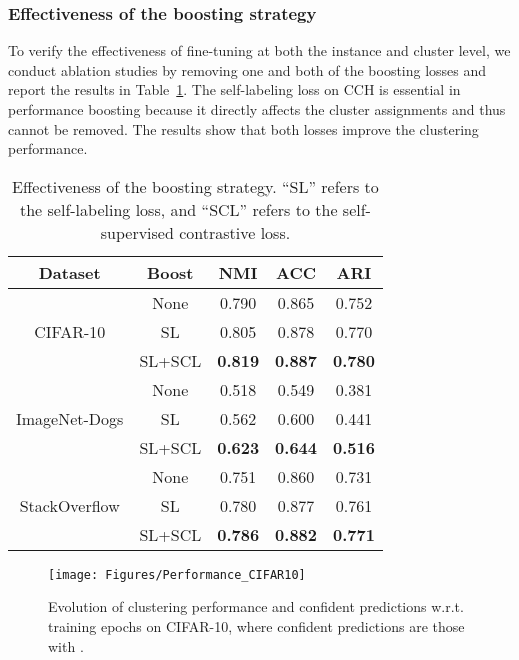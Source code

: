 \subsubsection{Effectiveness of the boosting strategy}

To verify the effectiveness of fine-tuning at both the instance and cluster level, we conduct ablation studies by removing one and both of the boosting losses and report the results in Table~\ref{tab:boosting}. The self-labeling loss on CCH is essential in performance boosting because it directly affects the cluster assignments and thus cannot be removed. The results show that both losses improve the clustering performance.

\begin{table}[h!]
\centering
\caption{Effectiveness of the boosting strategy. ``SL'' refers to the self-labeling loss, and ``SCL'' refers to the self-supervised contrastive loss.}
\begin{tabular}{@{}ccccc@{}}
\toprule
Dataset                      & Boost & NMI & ACC & ARI \\ \midrule
\multirow{3}{*}{CIFAR-10}    & None         & 0.790 & 0.865 & 0.752     \\
                             & SL        & 0.805 & 0.878 & 0.770      \\
                             & SL+SCL        &   \textbf{0.819}     &     \textbf{0.887}      & \textbf{0.780}     \\ \midrule
\multirow{3}{*}{ImageNet-Dogs} & None        & 0.518 & 0.549 & 0.381     \\
                             & SL        & 0.562 & 0.600 & 0.441    \\
                             & SL+SCL        & \textbf{0.623}    &   \textbf{0.644}  &  \textbf{0.516}   \\
                             \midrule
\multirow{3}{*}{StackOverflow} & None        & 0.751 & 0.860 & 0.731     \\
                             & SL        &  0.780   &  0.877   & 0.761    \\
                             & SL+SCL        & \textbf{0.786}    & \textbf{0.882}    &  \textbf{0.771}   \\ \bottomrule
\end{tabular}
\label{tab:boosting}
\end{table}

\begin{figure}[t]\centering
    \texttt{[image: Figures/Performance\_CIFAR10]}
    \caption{Evolution of clustering performance and confident predictions w.r.t. training epochs on CIFAR-10, where confident predictions are those with .}\label{fig:performance}
\end{figure}

